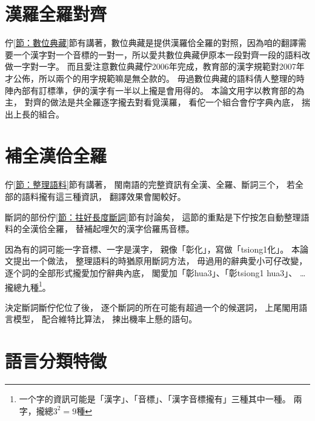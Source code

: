 \section{漢羅全羅對齊}
\label{節：漢羅全羅對齊}
佇\ref{節：數位典藏}節有講著，數位典藏是提供漢羅佮全羅的對照，因為咱的翻譯需要一个漢字對一个音標的一對一，所以愛共數位典藏伊原本一段對齊一段的語料改做一字對一字。
而且愛注意數位典藏佇2006年完成，教育部的漢字規範對2007年才公佈，所以兩个的用字規範嘛是無仝款的。
毋過數位典藏的語料倩人整理的時陣內部有訂標準，伊的漢字有一半以上攏是會用得的。
本論文用字以教育部的為主，
對齊的做法是共全羅逐字攏去對看覓漢羅，
看佗一个組合會佇字典內底，
揣出上長的組合。


\section{補全漢佮全羅}
\label{節：補全漢佮全羅}
佇\ref{節：整理語料}節有講著，
閩南語的完整資訊有全漢、全羅、斷詞三个，
若全部的語料攏有這三種資訊，
翻譯效果會閣較好。

斷詞的部份佇\ref{節：拄好長度斷詞}節有討論矣，
這節的重點是下佇按怎自動整理語料的全漢佮全羅，
替補起哩欠的漢字佮羅馬音標。

因為有的詞可能一字音標、一字是漢字，
親像「彰化」，寫做「tsiong1化」。
本論文提出一个做法，
整理語料的時猶原用斷詞方法，
毋過用的辭典愛小可仔改變，
逐个詞的全部形式攏愛加佇辭典內底，
閣愛加「彰hua3」、「彰tsiong1 hua3」、
…攏總九種\footnote{一个字的資訊可能是「漢字」、「音標」、「漢字音標攏有」三種其中一種。
兩字，攏總$3^{2}=9$種}。


決定斷詞斷佇佗位了後，
逐个斷詞的所在可能有超過一个的候選詞，
上尾閣用語言模型，
配合維特比算法，
揀出機率上懸的語句。


\section{語言分類特徵}
\label{節：語言分類特徵}

